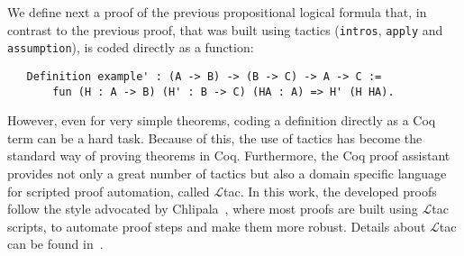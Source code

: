 We define next a proof of the previous propositional logical formula
that, in contrast to the previous proof, that was built using tactics
(\texttt{intros}, \texttt{apply} and \texttt{assumption}), is coded
directly as a function:
\begin{lstlisting}
   Definition example' : (A -> B) -> (B -> C) -> A -> C :=
       fun (H : A -> B) (H' : B -> C) (HA : A) => H' (H HA).
\end{lstlisting}
However, even for very simple theorems, coding a definition directly
as a Coq term can be a hard task. Because of this, the use of tactics
has become the standard way of proving theorems in Coq. Furthermore,
the Coq proof assistant provides not only a great number of tactics
but also a domain specific language for scripted proof automation,
called $\mathcal{L}$tac. In this work, the developed proofs follow the
style advocated by Chlipala~\cite{Chlipala13}, where most proofs are
built using $\mathcal{L}$tac scripts, to automate proof steps and make
them more robust. Details about $\mathcal{L}$tac can be found
in~\cite{Chlipala13,Bertot04}.


	
	

